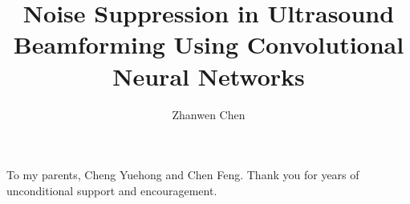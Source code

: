 \documentclass{ucbthesis}
\begin{document}

\title{Noise Suppression in Ultrasound Beamforming Using Convolutional Neural Networks}
\author{Zhanwen Chen}




\maketitle
\approvalpage
\copyrightpage



\begin{frontmatter}

\begin{dedication}
\null\vfil
\begin{center}
  To my parents, Cheng Yuehong and Chen Feng. Thank you for years of unconditional support and encouragement.
\end{center}
\vfil\null
\end{dedication}

\tableofcontents
\clearpage
\listoffigures
\clearpage
\listoftables

\begin{acknowledgements}
\end{acknowledgements}

\end{frontmatter}

\pagestyle{headings}



% 
% 


\printbibliography
\end{document}
